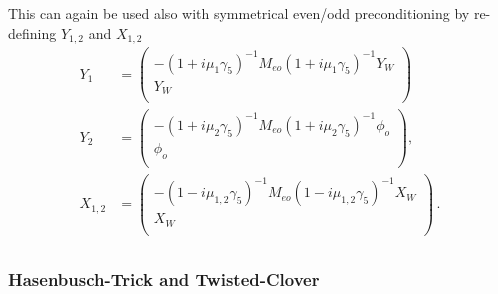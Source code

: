 This can again be used also with symmetrical even/odd preconditioning
by re-defining $Y_{1,2}$ and $X_{1,2}$
\begin{equation}
  \label{eq:mt7}
  \begin{split}
    Y_1 &= 
    \begin{pmatrix}
      -(1+i\mu_{1}\gamma_5)^{-1}M_{eo}(1+i\mu_{1}\gamma_5)^{-1}Y_W \\ Y_W\\
    \end{pmatrix}\, \\
    Y_2 &= 
    \begin{pmatrix}
      -(1+i\mu_{2}\gamma_5)^{-1}M_{eo}(1+i\mu_{2}\gamma_5)^{-1}\phi_o \\ \phi_o\\
    \end{pmatrix},\\
    X_{1,2} &= 
    \begin{pmatrix}
      -(1-i\mu_{1,2}\gamma_5)^{-1}M_{eo}(1-i\mu_{1,2}\gamma_5)^{-1}X_W \\ X_W\\
    \end{pmatrix}\, .\\
  \end{split}
\end{equation}

\subsubsection{Hasenbusch-Trick and Twisted-Clover}


